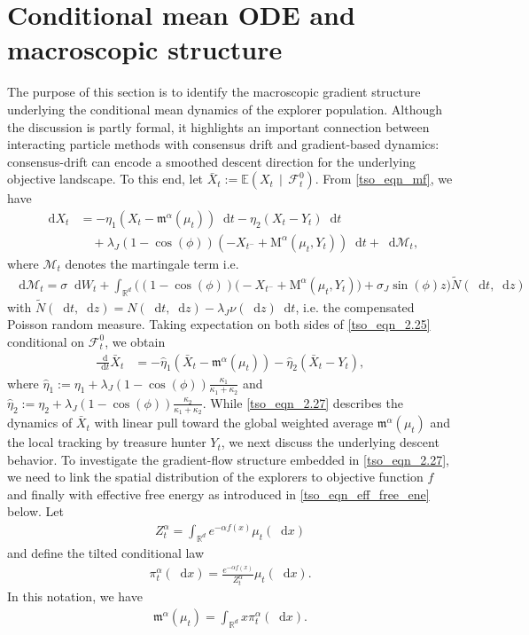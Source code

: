 \documentclass{article}
\def\m{\mathfrak{m}}
\newcommand*\der{\mathop{}\!\mathrm{d}}
\numberwithin{equation}{section}
\begin{document}
\section{Conditional mean ODE and macroscopic structure}\label{conditional_mean_ode_section}
The purpose of this section is to identify the macroscopic gradient structure underlying the conditional mean dynamics of the explorer population. Although the discussion is partly formal, it highlights an important connection between interacting particle methods with consensus drift and gradient-based dynamics: consensus-drift can encode a smoothed descent direction for the underlying objective landscape. To this end, let $\bar{X}_t := \mathbb{E}( X_t\, \mid \, \mathcal{F}^0_t)$. From \eqref{tso_eqn_mf}, we have
\begin{align} \label{tso_eqn_2.25}
    \der X_t &= -\eta_1(X_t - \m^\alpha(\mu_t)) \der t - \eta_2 (X_t - Y_t)\der t  \nonumber \\  &  \quad+ \lambda_J(1 - \cos(\phi)) (-X_{t^-} + \mathrm{M}^{\alpha}(\mu_t, Y_t)) \der t  + \der\mathcal{M}_t,
\end{align}
where $\mathcal{M}_t$ denotes the martingale term i.e. 
\begin{align}
    \der \mathcal{M}_t =  \sigma\der W_t + \int_{\mathbb{R}^d}\big( ( 1- \cos(\phi))\big( - X_{t^-} + \mathrm{M}^{\alpha}(\mu_t, Y_t)\big) + \sigma_J \sin(\phi)z\big) \tilde{N}(\der t, \der z) 
\end{align}
with $\tilde{N}(\der t, \der z) = N(\der t, \der z) - \lambda_J \nu(\der z) \der t  $, i.e. the compensated Poisson random measure. Taking expectation on  both sides of \eqref{tso_eqn_2.25} conditional on $\mathcal{F}_t^0$, we obtain 
\begin{align}\label{tso_eqn_2.27}
    \frac{\der}{\der t} \bar{X}_t &= -\hat{\eta}_1(\bar{X}_t - \m^\alpha(\mu_t)) - \hat{\eta}_2 (\bar{X}_t - Y_t), 
\end{align}
where $\hat{\eta}_1 := \eta_1 + \lambda_J ( 1 - \cos(\phi)) \frac{\kappa_1}{\kappa_1 + \kappa_2}$ and $ \hat{\eta}_2 := \eta_2 + \lambda_J(1- \cos(\phi))\frac{\kappa_2}{\kappa_1 + \kappa_2}$.  While \eqref{tso_eqn_2.27}   describes the dynamics of $\bar{X}_t$ with linear pull toward the global weighted average $\m^\alpha(\mu_t)$ and the local tracking by treasure hunter $Y_t$, we next discuss the underlying descent behavior. To investigate the gradient-flow structure embedded in \eqref{tso_eqn_2.27}, we need to link the spatial distribution of the explorers to objective function $f$ and finally with effective free energy as introduced in \eqref{tso_eqn_eff_free_ene} below.
Let 
\begin{align}
    Z_t^\alpha = \int_{\mathbb{R}^d} e^{-\alpha f(x) } \mu_t(\der x)
\end{align}
and define the tilted conditional law 
\begin{align}
    \pi_t^\alpha(\der x)  =  \frac{e^{-\alpha f(x)}}{Z_t^\alpha}\mu_t(\der x).
\end{align}
In this notation, we have
\begin{align}
    \m^{\alpha}(\mu_t) = \int_{\mathbb{R}^d} x \pi_t^\alpha (\der x). 
\end{align}
\end{document}
